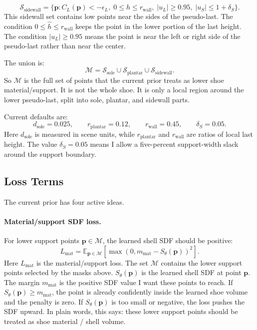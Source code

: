 \documentclass[11pt]{article}
\newcommand{\pt}{\mathbf{p}}
\begin{document}
\[
\mathcal{S}_{\text{sidewall}}
=
\{\pt:
C_L(\pt)<-\epsilon_L,\;
0\le \hat{h}\le r_{\text{wall}},\;
|u_L|\ge 0.95,\;
|u_S|\le 1+\delta_S
\}.
\]
This sidewall set contains low points near the sides of the pseudo-last.  The
condition \(0\le \hat{h}\le r_{\text{wall}}\) keeps the point in the lower
portion of the last height.  The condition \(|u_L|\ge 0.95\) means the point is
near the left or right side of the pseudo-last rather than near the center.

The union is:
\[
\mathcal{M}
=
\mathcal{S}_{\text{sole}}
\cup
\mathcal{S}_{\text{plantar}}
\cup
\mathcal{S}_{\text{sidewall}}.
\]
So \(\mathcal{M}\) is the full set of points that the current prior treats as
lower shoe material/support.  It is not the whole shoe.  It is only a local
region around the lower pseudo-last, split into sole, plantar, and sidewall
parts.

Current defaults are:
\[
d_{\text{sole}}=0.025,\qquad
r_{\text{plantar}}=0.12,\qquad
r_{\text{wall}}=0.45,\qquad
\delta_S=0.05.
\]
Here \(d_{\text{sole}}\) is measured in scene units, while
\(r_{\text{plantar}}\) and \(r_{\text{wall}}\) are ratios of local last height.
The value \(\delta_S=0.05\) means I allow a five-percent support-width slack
around the support boundary.

\subsection{Loss Terms}

The current prior has four active ideas.

\paragraph{Material/support SDF loss.}
For lower support points \(\pt\in\mathcal{M}\), the learned shell SDF should be
positive:
\[
L_{\text{mat}}
=
\mathbb{E}_{\pt\in\mathcal{M}}
\left[
\max(0,m_{\text{mat}}-S_\theta(\pt))^2
\right].
\]
Here \(L_{\text{mat}}\) is the material/support loss.  The set
\(\mathcal{M}\) contains the lower support points selected by the masks above.
\(S_\theta(\pt)\) is the learned shell SDF at point \(\pt\).  The margin
\(m_{\text{mat}}\) is the positive SDF value I want these points to reach.
If \(S_\theta(\pt)\ge m_{\text{mat}}\), the point is already confidently inside
the learned shoe volume and the penalty is zero.  If \(S_\theta(\pt)\) is too
small or negative, the loss pushes the SDF upward.  In plain words, this says:
these lower support points should be treated as shoe material / shell volume.
\end{document}
